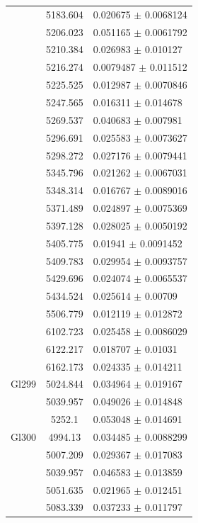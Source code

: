 \begin{longtable}{|c|c|l|}
 & 5183.604 & 0.020675 $\pm$ 0.0068124 \\       
 & 5206.023 & 0.051165 $\pm$ 0.0061792 \\       
 & 5210.384 & 0.026983 $\pm$ 0.010127 \\        
 & 5216.274 & 0.0079487 $\pm$ 0.011512 \\       
 & 5225.525 & 0.012987 $\pm$ 0.0070846 \\       
 & 5247.565 & 0.016311 $\pm$ 0.014678 \\        
 & 5269.537 & 0.040683 $\pm$ 0.007981 \\        
 & 5296.691 & 0.025583 $\pm$ 0.0073627 \\       
 & 5298.272 & 0.027176 $\pm$ 0.0079441 \\       
 & 5345.796 & 0.021262 $\pm$ 0.0067031 \\       
 & 5348.314 & 0.016767 $\pm$ 0.0089016 \\       
 & 5371.489 & 0.024897 $\pm$ 0.0075369 \\       
 & 5397.128 & 0.028025 $\pm$ 0.0050192 \\       
 & 5405.775 & 0.01941 $\pm$ 0.0091452 \\        
 & 5409.783 & 0.029954 $\pm$ 0.0093757 \\       
 & 5429.696 & 0.024074 $\pm$ 0.0065537 \\       
 & 5434.524 & 0.025614 $\pm$ 0.00709 \\         
 & 5506.779 & 0.012119 $\pm$ 0.012872 \\        
 & 6102.723 & 0.025458 $\pm$ 0.0086029 \\       
 & 6122.217 & 0.018707 $\pm$ 0.01031 \\         
 & 6162.173 & 0.024335 $\pm$ 0.014211 \\        
\hline                                          
Gl299 & 5024.844 & 0.034964 $\pm$ 0.019167 \\   
 & 5039.957 & 0.049026 $\pm$ 0.014848 \\        
 & 5252.1 & 0.053048 $\pm$ 0.014691 \\          
\hline                                          
Gl300 & 4994.13 & 0.034485 $\pm$ 0.0088299 \\   
 & 5007.209 & 0.029367 $\pm$ 0.017083 \\        
 & 5039.957 & 0.046583 $\pm$ 0.013859 \\        
 & 5051.635 & 0.021965 $\pm$ 0.012451 \\        
 & 5083.339 & 0.037233 $\pm$ 0.011797 \\        

\end{longtable}
